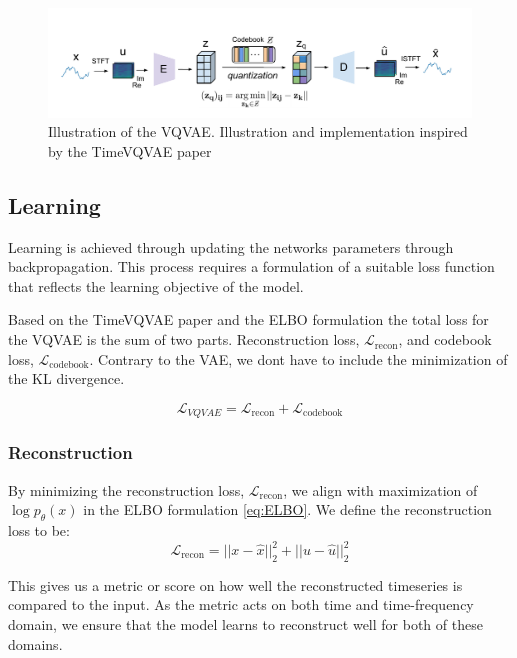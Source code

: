 \begin{center}
\begin{figure}[H]
    \includegraphics[scale=0.8]{figures/figure-pdf/VQVAE.pdf}
    \caption{ Illustration of the VQVAE. Illustration and implementation inspired by the TimeVQVAE paper\cite{lee2023masked} }
    \label{fig:VQVAE}
\end{figure}
\end{center}

\subsection{Learning}
Learning is achieved through updating the networks parameters through backpropagation. This process requires a formulation of a suitable loss function that reflects the learning objective of the model.

Based on the TimeVQVAE\cite{lee2023masked} paper and the ELBO formulation the total loss for the VQVAE is the sum of two parts. Reconstruction loss, $\mathcal{L}_{\text{recon}}$, and codebook loss, $\mathcal{L}_\text{codebook}$.
Contrary to the VAE, we dont have to include the minimization of the KL divergence.

\begin{equation}
    \mathcal{L}_{VQVAE} = \mathcal{L}_\text{recon} + \mathcal{L}_\text{codebook}
    \label{eq:VQVAEloss}
\end{equation}

\subsubsection{Reconstruction}
By minimizing the reconstruction loss, $\mathcal{L}_{\text{recon}}$, we align with maximization of $\log p_\theta(x)$ in the ELBO formulation \ref{eq:ELBO}.
We define the reconstruction loss to be:
\begin{equation}
    \mathcal{L}_{\text{recon}} = ||x-\hat{x}||_2^2 + ||u-\hat{u}||_2^2
\end{equation}

This gives us a metric or score on how well the reconstructed timeseries is compared to the input. As the metric acts on both time and time-frequency domain, we ensure that the 
model learns to reconstruct well for both of these domains.

